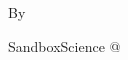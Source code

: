 \begin{titlepage}
    \begin{center}
        \vspace*{2in}
        \makeatletter
            {\Huge\bfseries \@title \par}
            \vspace{1em}

            {\large By \@author \par}
            \vspace{1em}

            {\small SandboxScience @ \@date \par}
        \makeatother
    \end{center}
\end{titlepage}